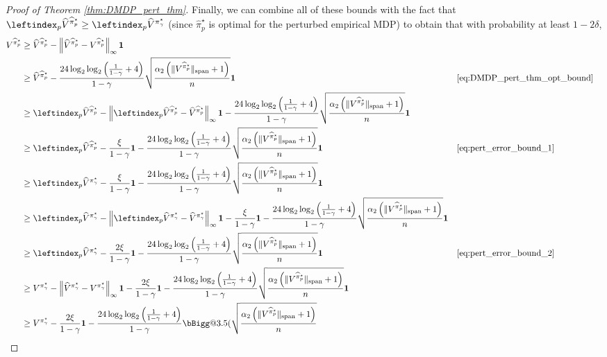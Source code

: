 \documentclass{article}
\makeatletter
\newcommand{\Biggg}{\bBigg@{3.5}}
\theoremstyle{plain}
\theoremstyle{plain}
\theoremstyle{remark}
\theoremstyle{plain}
\theoremstyle{plain}
\newcommand{\Vhat}{\widehat{V}}
\newcommand{\pistar}{\pi^\star}
\newcommand{\one}{\mathbf{1}}
\newcommand{\pihat}{\widehat{\pi}}
\newcommand{\Vhatpert}{\leftindex_p{\Vhat}}
\newcommand{\pihatpert}{\pihat^\star_p}
\makeatother
\begin{document}
\begin{proof}[Proof of Theorem \ref{thm:DMDP_pert_thm}]
    Finally, we can combine all of these bounds with the fact that $\Vhatpert^{\pihatpert} \geq \Vhatpert^{\pistar_\gamma}$ (since $\pihatpert$ is optimal for the perturbed empirical MDP) to obtain that with probability at least $1 - 2 \delta$,
    \begin{align*}
        V^{\pihatpert} & \geq \Vhat^{\pihatpert} - \infnorm{\Vhat^{\pihatpert}  - V^{\pihatpert}} \one \\
        & \geq \Vhat^{\pihatpert} - \frac{24 \log_2 \log_2 \left( \frac{1}{1-\gamma} + 4\right)  }{1-\gamma}\sqrt{\frac{ \alpha_2 \left( \spannorm{V^{\pihatpert}} + 1\right)}{n}} \one && \text{\eqref{eq:DMDP_pert_thm_opt_bound}} \\
        & \geq \Vhatpert^{\pihatpert} - \infnorm{\Vhatpert^{\pihatpert} - \Vhat^{\pihatpert}} \one - \frac{24 \log_2 \log_2 \left( \frac{1}{1-\gamma} + 4\right)  }{1-\gamma}\sqrt{\frac{ \alpha_2 \left( \spannorm{V^{\pihatpert}} + 1\right)}{n}} \one \\
        & \geq \Vhatpert^{\pihatpert} - \frac{\xi}{1-\gamma}\one - \frac{24 \log_2 \log_2 \left( \frac{1}{1-\gamma} + 4\right)  }{1-\gamma}\sqrt{\frac{ \alpha_2 \left( \spannorm{V^{\pihatpert}} + 1\right)}{n}} \one && \text{\eqref{eq:pert_error_bound_1}} \\
        & \geq \Vhatpert^{\pistar_\gamma} - \frac{\xi}{1-\gamma}\one - \frac{24 \log_2 \log_2 \left( \frac{1}{1-\gamma} + 4\right)  }{1-\gamma}\sqrt{\frac{ \alpha_2 \left( \spannorm{V^{\pihatpert}} + 1\right)}{n}} \one \\
        & \geq \Vhatpert^{\pistar_\gamma}- \infnorm{\Vhatpert^{\pistar_\gamma} - \Vhat^{\pistar_\gamma}} \one - \frac{\xi}{1-\gamma}\one - \frac{24 \log_2 \log_2 \left( \frac{1}{1-\gamma} + 4\right)  }{1-\gamma}\sqrt{\frac{ \alpha_2 \left( \spannorm{V^{\pihatpert}} + 1\right)}{n}} \one \\
        & \geq \Vhatpert^{\pistar_\gamma}-  \frac{2\xi}{1-\gamma}\one - \frac{24 \log_2 \log_2 \left( \frac{1}{1-\gamma} + 4\right)  }{1-\gamma}\sqrt{\frac{ \alpha_2 \left( \spannorm{V^{\pihatpert}} + 1\right)}{n}} \one && \text{\eqref{eq:pert_error_bound_2}} \\
        & \geq V^{\pistar_\gamma}-  \infnorm{ \Vhat^{\pistar_\gamma} - V^{\pistar_\gamma}}\one - \frac{2\xi}{1-\gamma}\one - \frac{24 \log_2 \log_2 \left( \frac{1}{1-\gamma} + 4\right)  }{1-\gamma}\sqrt{\frac{ \alpha_2 \left( \spannorm{V^{\pihatpert}} + 1\right)}{n}} \one  \\
        & \geq V^{\pistar_\gamma} - \frac{2\xi}{1-\gamma}\one - \frac{24 \log_2 \log_2 \left( \frac{1}{1-\gamma} + 4\right)  }{1-\gamma}\Biggg(\sqrt{\frac{ \alpha_2 \left( \spannorm{V^{\pihatpert}} + 1\right)}{n}} \\

\end{align*}
\end{proof}
\end{document}
